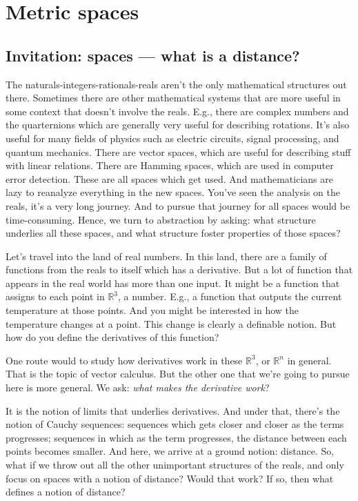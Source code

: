 \chapter{Metric spaces}

\section{Invitation: spaces --- what is a distance?}

The naturals-integers-rationals-reals aren't the only mathematical structures out there.
Sometimes there are other mathematical systems that are more useful in some context that
doesn't involve the reals. E.g., there are complex numbers and the quarternions which are generally
very useful for describing rotations. It's also useful for many fields of physics such as electric
circuits, signal processing, and quantum mechanics. There are vector spaces, which are useful
for describing stuff with linear relations. There are Hamming spaces, which are used in computer
error detection. These are all spaces which get used. And mathematicians are lazy to reanalyze
everything in the new spaces. You've seen the analysis on the reals, it's a very long journey. And
to pursue that journey for all spaces would be time-consuming. Hence, we turn to
abstraction by asking: what structure underlies all these spaces, and what structure
foster properties of those spaces?

Let's travel into the land of real numbers. In this land, there are a family of functions from the
reals to itself which has a derivative. But a lot of function that appears in the real world has
more than one input. It might be a function that assigns to each point in \(\mathbb{R}^3\), a
number. E.g., a function that outputs the current temperature at those points. And
you might be interested in how the temperature changes at a point. This change is
clearly a definable notion. But how do you define the derivatives of this function?

One route would to study how derivatives work in these \(\mathbb{R}^3\), or \(\mathbb{R}^n\)
in general. That is the topic of vector calculus. But the other one that we're going
to pursue here is more general. We ask: \emph{what makes the derivative work}?

It is the notion of limits that underlies derivatives. And under that, there's the notion
of Cauchy sequences: sequences which gets closer and closer as the terms progresses;
sequences in which as the term progresses, the distance between each points becomes
smaller. And here, we arrive at a ground notion: distance. So, what if we throw out all
the other unimportant structures of the reals, and only focus on spaces with a notion
of distance? Would that work? If so, then what defines a notion of distance?

